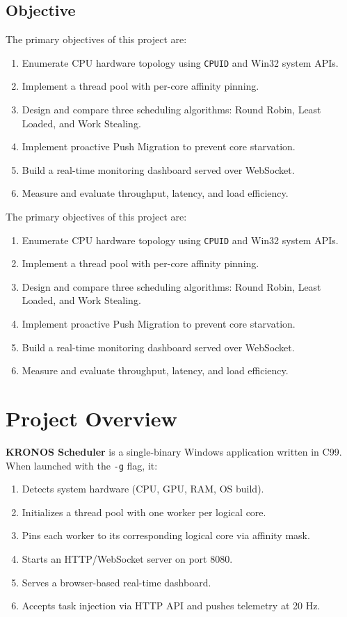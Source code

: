 \documentclass[12pt,a4paper]{article}
\begin{document}
\subsection{Objective}

The primary objectives of this project are:
\begin{enumerate}[label=\roman*.]
  \item Enumerate CPU hardware topology using \texttt{CPUID} and Win32 system APIs.
  \item Implement a thread pool with per-core affinity pinning.
  \item Design and compare three scheduling algorithms: Round Robin, Least Loaded, and Work Stealing.
  \item Implement proactive Push Migration to prevent core starvation.
  \item Build a real-time monitoring dashboard served over WebSocket.
  \item Measure and evaluate throughput, latency, and load efficiency.
\end{enumerate}


The primary objectives of this project are:
\begin{enumerate}[label=\roman*.]
  \item Enumerate CPU hardware topology using \texttt{CPUID} and Win32 system APIs.
  \item Implement a thread pool with per-core affinity pinning.
  \item Design and compare three scheduling algorithms: Round Robin, Least Loaded, and Work Stealing.
  \item Implement proactive Push Migration to prevent core starvation.
  \item Build a real-time monitoring dashboard served over WebSocket.
  \item Measure and evaluate throughput, latency, and load efficiency.
\end{enumerate}

\section{Project Overview}

\textbf{KRONOS Scheduler} is a single-binary Windows application written in C99. When launched with the \texttt{-g} flag, it:

\begin{enumerate}
  \item Detects system hardware (CPU, GPU, RAM, OS build).
  \item Initializes a thread pool with one worker per logical core.
  \item Pins each worker to its corresponding logical core via affinity mask.
  \item Starts an HTTP/WebSocket server on port 8080.
  \item Serves a browser-based real-time dashboard.
  \item Accepts task injection via HTTP API and pushes telemetry at 20 Hz.
\end{enumerate}
\end{document}
